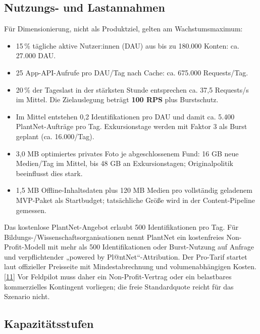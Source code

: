\documentclass[10pt,a4paper,oneside]{article}
\newcommand{\Src}[1]{\hyperlink{src:#1}{\textcolor{Forest}{[#1]}}}
\begin{document}
\subsection{Nutzungs- und Lastannahmen}

Für Dimensionierung, nicht als Produktziel, gelten am Wachstumsmaximum:

\begin{itemize}
  \item 15\,\% tägliche aktive Nutzer:innen (DAU) aus bis zu 180.000 Konten: ca. 27.000 DAU.
  \item 25 App-API-Aufrufe pro DAU/Tag nach Cache: ca. 675.000 Requests/Tag.
  \item 20\,\% der Tageslast in der stärksten Stunde entsprechen ca. 37,5 Requests/s im Mittel. Die Zielauslegung beträgt \textbf{100 RPS} plus Burstschutz.
  \item Im Mittel entstehen 0,2 Identifikationen pro DAU und damit ca. 5.400 PlantNet-Aufträge pro Tag. Exkursionstage werden mit Faktor 3 als Burst geplant (ca. 16.000/Tag).
  \item 3,0 MB optimiertes privates Foto je abgeschlossenem Fund: 16 GB neue Medien/Tag im Mittel, bis 48 GB an Exkursionstagen; Originalpolitik beeinflusst dies stark.
  \item 1,5 MB Offline-Inhaltsdaten plus 120 MB Medien pro vollständig geladenem MVP-Paket als Startbudget; tatsächliche Größe wird in der Content-Pipeline gemessen.
\end{itemize}

Das kostenlose PlantNet-Angebot erlaubt 500 Identifikationen pro Tag. Für Bildungs-/Wissenschaftsorganisationen nennt PlantNet ein kostenfreies Non-Profit-Modell mit mehr als 500 Identifikationen oder Burst-Nutzung auf Anfrage und verpflichtender „powered by Pl@ntNet“-Attribution. Der Pro-Tarif startet laut offizieller Preisseite mit Mindestabrechnung und volumenabhängigen Kosten.\Src{11} Vor Feldpilot muss daher ein Non-Profit-Vertrag oder ein belastbares kommerzielles Kontingent vorliegen; die freie Standardquote reicht für das Szenario nicht.

\subsection{Kapazitätsstufen}
\end{document}
